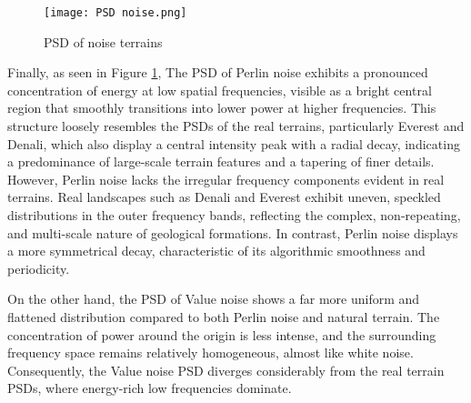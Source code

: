 \begin{figure}[H]
    \centering
    \texttt{[image: PSD noise.png]}
    \caption{PSD of noise terrains}
    \label{fig:PSD_noise}
\end{figure}

Finally, as seen in Figure \ref{fig:PSD_noise}, The PSD of Perlin noise exhibits a pronounced concentration of energy at low spatial frequencies, visible as a bright central region that smoothly transitions into lower 
power at higher frequencies. This structure loosely resembles the PSDs of the real terrains, particularly Everest and Denali, which also display a central intensity peak with a radial decay, indicating 
a predominance of large-scale terrain features and a tapering of finer details. However, Perlin noise lacks the irregular frequency components evident in real terrains. Real landscapes such as Denali and 
Everest exhibit uneven, speckled distributions in the outer frequency bands, reflecting the complex, non-repeating, and multi-scale nature of geological formations. In contrast, Perlin noise displays a 
more symmetrical decay, characteristic of its algorithmic smoothness and periodicity.

On the other hand, the PSD of Value noise shows a far more uniform and flattened distribution compared to both Perlin noise and natural terrain. The concentration of power around the origin is less intense, 
and the surrounding frequency space remains relatively homogeneous, almost like white noise. Consequently, the Value noise PSD diverges considerably from the real terrain PSDs, where energy-rich low 
frequencies dominate. 
